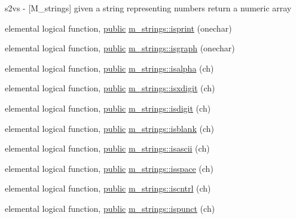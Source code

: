 \begin{DoxyCompactItemize}
\begin{DoxyCompactList}
s2vs -\/ \mbox{[}M\+\_\+strings\mbox{]} given a string representing numbers return a numeric array \end{DoxyCompactList}\item 
elemental logical function, \hyperlink{M__stopwatch_83_8txt_a2f74811300c361e53b430611a7d1769f}{public} \hyperlink{namespacem__strings_a267f2fde729a75496c82a64754a91e54}{m\+\_\+strings\+::isprint} (onechar)
\item 
elemental logical function, \hyperlink{M__stopwatch_83_8txt_a2f74811300c361e53b430611a7d1769f}{public} \hyperlink{namespacem__strings_a84c80fdeeba0679488ed8ad8d37e53c5}{m\+\_\+strings\+::isgraph} (onechar)
\item 
elemental logical function, \hyperlink{M__stopwatch_83_8txt_a2f74811300c361e53b430611a7d1769f}{public} \hyperlink{namespacem__strings_a5cf6d7fbd1b3ea17e37c6213c6ba0fdb}{m\+\_\+strings\+::isalpha} (ch)
\item 
elemental logical function, \hyperlink{M__stopwatch_83_8txt_a2f74811300c361e53b430611a7d1769f}{public} \hyperlink{namespacem__strings_a9953d1e400bedceab6a06910c6cdf208}{m\+\_\+strings\+::isxdigit} (ch)
\item 
elemental logical function, \hyperlink{M__stopwatch_83_8txt_a2f74811300c361e53b430611a7d1769f}{public} \hyperlink{namespacem__strings_a9f5f98a6c93e21618a16d98a5de2debc}{m\+\_\+strings\+::isdigit} (ch)
\item 
elemental logical function, \hyperlink{M__stopwatch_83_8txt_a2f74811300c361e53b430611a7d1769f}{public} \hyperlink{namespacem__strings_aebb074d3971c0b93e39d1cfaa45658d8}{m\+\_\+strings\+::isblank} (ch)
\item 
elemental logical function, \hyperlink{M__stopwatch_83_8txt_a2f74811300c361e53b430611a7d1769f}{public} \hyperlink{namespacem__strings_afb63e9fefbc04e4e9a2ec4df4334078c}{m\+\_\+strings\+::isascii} (ch)
\item 
elemental logical function, \hyperlink{M__stopwatch_83_8txt_a2f74811300c361e53b430611a7d1769f}{public} \hyperlink{namespacem__strings_ab32380c29451e56395153155c1632d74}{m\+\_\+strings\+::isspace} (ch)
\item 
elemental logical function, \hyperlink{M__stopwatch_83_8txt_a2f74811300c361e53b430611a7d1769f}{public} \hyperlink{namespacem__strings_a4821cb5a5c4024c9dc6dd159300034ca}{m\+\_\+strings\+::iscntrl} (ch)
\item 
elemental logical function, \hyperlink{M__stopwatch_83_8txt_a2f74811300c361e53b430611a7d1769f}{public} \hyperlink{namespacem__strings_a8712164e1f5fd717bdea854a3f067619}{m\+\_\+strings\+::ispunct} (ch)

\end{DoxyCompactItemize}
